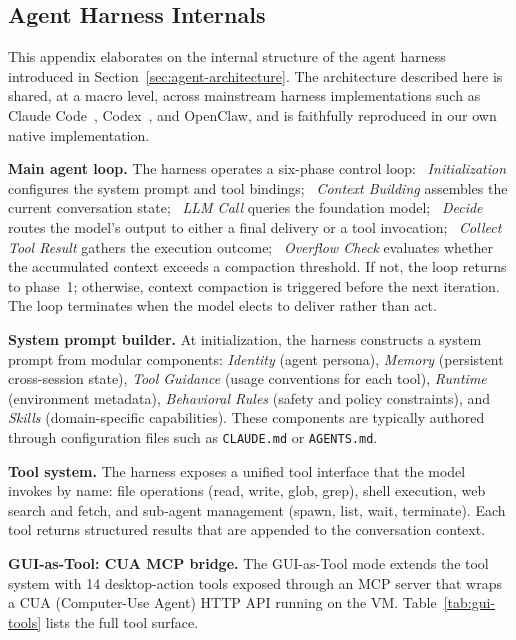 \subsection{Agent Harness Internals}
\label{app:agent-harness}

This appendix elaborates on the internal structure of the agent harness introduced in Section~\ref{sec:agent-architecture}. The architecture described here is shared, at a macro level, across mainstream harness implementations such as Claude Code~\citep{anthropic2025claudecode}, Codex~\citep{openai2025codex}, and OpenClaw, and is faithfully reproduced in our own native implementation.

\noindent \textbf{Main agent loop.}
The harness operates a six-phase control loop: ~\emph{Initialization} configures the system prompt and tool bindings; ~\emph{Context Building} assembles the current conversation state; ~\emph{LLM Call} queries the foundation model; ~\emph{Decide} routes the model's output to either a final delivery or a tool invocation; ~\emph{Collect Tool Result} gathers the execution outcome; ~\emph{Overflow Check} evaluates whether the accumulated context exceeds a compaction threshold. If not, the loop returns to phase~1; otherwise, context compaction is triggered before the next iteration. The loop terminates when the model elects to deliver rather than act.

\noindent \textbf{System prompt builder.}
At initialization, the harness constructs a system prompt from modular components: \emph{Identity} (agent persona), \emph{Memory} (persistent cross-session state), \emph{Tool Guidance} (usage conventions for each tool), \emph{Runtime} (environment metadata), \emph{Behavioral Rules} (safety and policy constraints), and \emph{Skills} (domain-specific capabilities). These components are typically authored through configuration files such as \texttt{CLAUDE.md} or \texttt{AGENTS.md}.

\noindent \textbf{Tool system.}
The harness exposes a unified tool interface that the model invokes by name: file operations (read, write, glob, grep), shell execution, web search and fetch, and sub-agent management (spawn, list, wait, terminate). Each tool returns structured results that are appended to the conversation context.

\noindent \textbf{GUI-as-Tool: CUA MCP bridge.}
The GUI-as-Tool mode extends the tool system with 14 desktop-action tools exposed through an MCP server that wraps a CUA (Computer-Use Agent) HTTP API running on the VM. Table~\ref{tab:gui-tools} lists the full tool surface.

